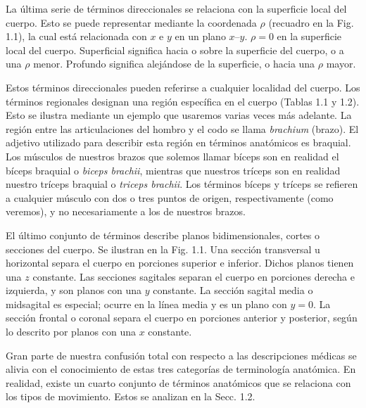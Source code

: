 \documentclass[12pt]{book}
\begin{document}
La última serie de términos direccionales se relaciona con la superficie local del cuerpo. Esto se puede representar mediante la coordenada $\rho$ (recuadro en la Fig. 1.1), la cual está relacionada con $x$ e $y$ en un plano $x\text{--}y$. $\rho = 0$ en la superficie local del cuerpo. Superficial significa hacia o sobre la superficie del cuerpo, o a una $\rho$ menor. Profundo significa alejándose de la superficie, o hacia una $\rho$ mayor.

Estos términos direccionales pueden referirse a cualquier localidad del cuerpo. Los términos regionales designan una región específica en el cuerpo (Tablas 1.1 y 1.2). Esto se ilustra mediante un ejemplo que usaremos varias veces más adelante. La región entre las articulaciones del hombro y el codo se llama \textit{brachium} (brazo). El adjetivo utilizado para describir esta región en términos anatómicos es braquial. Los músculos de nuestros brazos que solemos llamar bíceps son en realidad el bíceps braquial o \textit{biceps brachii}, mientras que nuestros tríceps son en realidad nuestro tríceps braquial o \textit{triceps brachii}. Los términos bíceps y tríceps se refieren a cualquier músculo con dos o tres puntos de origen, respectivamente (como veremos), y no necesariamente a los de nuestros brazos.

El último conjunto de términos describe planos bidimensionales, cortes o secciones del cuerpo. Se ilustran en la Fig. 1.1. Una sección transversal u horizontal separa el cuerpo en porciones superior e inferior. Dichos planos tienen una $z$ constante. Las secciones sagitales separan el cuerpo en porciones derecha e izquierda, y son planos con una $y$ constante. La sección sagital media o midsagital es especial; ocurre en la línea media y es un plano con $y = 0$. La sección frontal o coronal separa el cuerpo en porciones anterior y posterior, según lo descrito por planos con una $x$ constante.

Gran parte de nuestra confusión total con respecto a las descripciones médicas se alivia con el conocimiento de estas tres categorías de terminología anatómica. En realidad, existe un cuarto conjunto de términos anatómicos que se relaciona con los tipos de movimiento. Estos se analizan en la Secc. 1.2.
\end{document}
